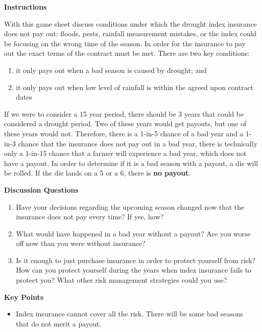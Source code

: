 \documentclass[letterpaper,10pt,english]{sphinxmanual}
\begin{document}
\textbf{Instructions}

With this game sheet discuss conditions under which the drought index insurance does not pay out: floods, pests, rainfall measurement mistakes, or the index could be focusing on the wrong time of the season. In order for the insurance to pay out the exact terms of the contract must be met. There are two key conditions:
\begin{enumerate}
\item {} 
it only pays out when a bad season is caused by drought; and

\item {} 
it only pays out when low level of rainfall is within the agreed upon contract dates

\end{enumerate}

If we were to consider a 15 year period, there should be 3 years that could be considered a drought period. Two of these years would get payouts, but one of these years would not. Therefore, there is a 1-in-5 chance of a bad year and a 1-in-3 chance that the insurance does not pay out in a bad year, there is technically only a 1-in-15 chance that a farmer will experience a bad year, which does not have a payout. In order to determine if it is a bad season with a payout, a die will be rolled. If the die lands on a 5 or a 6, there is \textbf{no payout}.

\textbf{Discussion Questions}
\begin{enumerate}
\item {} 
Have your decisions regarding the upcoming season changed now that the insurance does not pay every time? If yes, how?

\item {} 
What would have happened in a bad year without a payout? Are you worse off now than you were without insurance?

\item {} 
Is it enough to just purchase insurance in order to protect yourself from risk? How can you protect yourself during the years when index insurance fails to protect you? What other risk management strategies could you use?

\end{enumerate}

\textbf{Key Points}
\begin{itemize}
\item {} 
Index insurance cannot cover all the risk. There will be some bad seasons that do not merit a payout.

\end{itemize}
\end{document}

